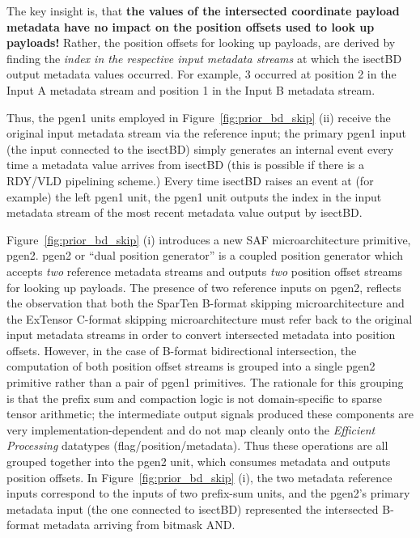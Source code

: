 The key insight is, that \textbf{the values of the intersected coordinate payload metadata have no impact on the position offsets used to look up payloads!} Rather, the position offsets for looking up payloads, are derived by finding the \textit{index in the respective input metadata streams} at which the isectBD output metadata values occurred. For example, 3 occurred at position 2 in the Input A metadata stream and position 1 in the Input B metadata stream. 

Thus, the pgen1 units employed in Figure~\ref{fig:prior_bd_skip} (ii) receive the original input metadata stream via the reference input; the primary pgen1 input (the input connected to the isectBD) simply generates an internal event every time a metadata value arrives from isectBD (this is possible if there is a RDY/VLD pipelining scheme.) Every time isectBD raises an event at (for example) the left pgen1 unit, the pgen1 unit outputs the index in the input metadata stream of the most recent metadata value output by isectBD.

Figure~\ref{fig:prior_bd_skip} (i) introduces a new SAF microarchitecture primitive, pgen2. pgen2 or ``dual position generator'' is a coupled position generator which accepts \textit{two} reference metadata streams and outputs \textit{two} position offset streams for looking up payloads. The presence of two reference inputs on pgen2, reflects the observation that both the SparTen B-format skipping microarchitecture and the ExTensor C-format skipping microarchitecture must refer back to the original input metadata streams in order to convert intersected metadata into position offsets. However, in the case of B-format bidirectional intersection, the computation of both position offset streams is grouped into a single pgen2 primitive rather than a pair of pgen1 primitives. The rationale for this grouping is that the prefix sum and compaction logic is not domain-specific to sparse tensor arithmetic; the intermediate output signals produced these components are very implementation-dependent and do not map cleanly onto the \textit{Efficient Processing} datatypes (flag/position/metadata). Thus these operations are all grouped together into the pgen2 unit, which consumes metadata and outputs position offsets. In Figure~\ref{fig:prior_bd_skip} (i), the two metadata reference inputs correspond to the inputs of two prefix-sum units, and the pgen2's primary metadata input (the one connected to isectBD) represented the intersected B-format metadata arriving from bitmask AND.

